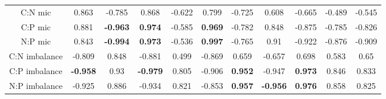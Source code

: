 \documentclass[authoryear,preprint,review,12pt]{elsarticle}
\begin{document}
\begin{table}[h!]
\begin{center}
{\begin{tabular}{ccccccccccc}
  C:N mic & 0.863 & -0.785 & 0.868 & -0.622 & 0.799 & -0.725 & 0.608 & -0.665 & -0.489 & -0.545 \\ 
  C:P mic & 0.881 & \textbf{ -0.963 } & \textbf{ 0.974 } & -0.585 & \textbf{ 0.969 } & -0.782 & 0.848 & -0.875 & -0.785 & -0.826 \\ 
  N:P mic & 0.843 & \textbf{ -0.994 } & \textbf{ 0.973 } & -0.536 & \textbf{ 0.997 } & -0.765 & 0.91 & -0.922 & -0.876 & -0.909 \\ 
  C:N imbalance & -0.809 & 0.848 & -0.881 & 0.499 & -0.869 & 0.659 & -0.657 & 0.698 & 0.583 & 0.65 \\ 
  C:P imbalance & \textbf{ -0.958 } & 0.93 & \textbf{ -0.979 } & 0.805 & -0.906 & \textbf{ 0.952 } & -0.947 & \textbf{ 0.973 } & 0.846 & 0.833 \\ 
  N:P imbalance & -0.925 & 0.886 & -0.934 & 0.821 & -0.853 & \textbf{ 0.957 } & \textbf{ -0.956 } & \textbf{ 0.976 } & 0.858 & 0.825 \\ 
   \hline
\end{tabular}
}
\end{center}
\end{table}
\newpage
\end{document}
